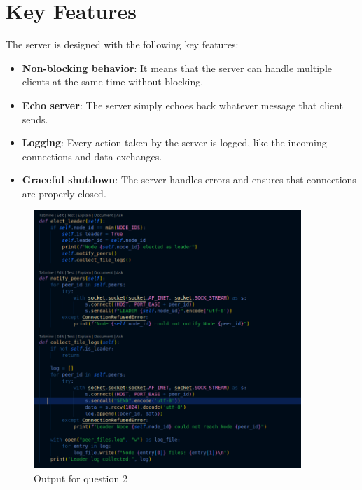 \documentclass{exam}
\begin{document}
\section*{Key Features}
The server is designed with the following key features:
\begin{itemize}
    \item \textbf{Non-blocking behavior}: It means that the server can handle multiple clients at the same time without blocking.
    \item \textbf{Echo server}: The server simply echoes back whatever message that client sends.
    \item \textbf{Logging}: Every action taken by the server is logged, like the  incoming connections and data exchanges.
    \item \textbf{Graceful shutdown}: The server handles errors and ensures  thst connections are properly closed.
\end{itemize}
\begin{figure}[H]
    \centering
    \includegraphics[width=0.9\textwidth]{Q2_1.png } 
    \caption{Output for question 2}
    \label{fig:output1}
\end{figure}
\end{document}
